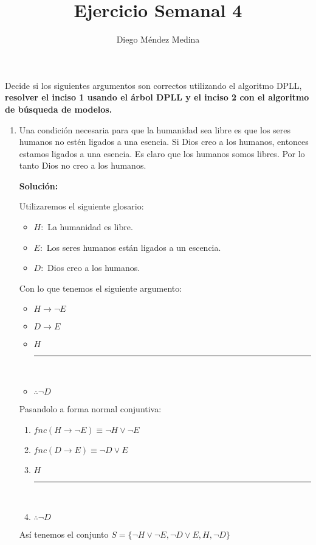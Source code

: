 \documentclass[8pt, letterpaper]{article}
\title{%
  Ejercicio Semanal 4\\
  {\large{}}}
\author{Diego Méndez Medina}
\date{}
\begin{document}
\ttfamily
\maketitle
\rmfamily
Decide si los siguientes argumentos son correctos utilizando el algoritmo DPLL,
{\bf resolver el inciso 1 usando el árbol DPLL y el inciso 2 con el algoritmo
  de búsqueda de modelos.}
\begin{enumerate}
\item Una condición necesaria para que la humanidad sea libre es que los seres
  humanos no estén ligados a una esencia. Si Dios creo a los humanos, entonces
  estamos ligados a una esencia. Es claro que los humanos somos libres. Por
  lo tanto Dios no creo a los humanos.

  \ttfamily
  {\bf Solución:}

  Utilizaremos el siguiente glosario:
  \begin{itemize}
  \item $H:$ La humanidad es libre.
  \item $E:$ Los seres humanos están ligados a un escencia.
  \item $D:$ Dios creo a los humanos.
  \end{itemize}


  \begin{multicols}{2}
    Con lo que tenemos el siguiente argumento:
  \begin{itemize}
  \item $H \rightarrow \neg E$
  \item $D \rightarrow E$
  \item $H$ \\
    \rule{.3\textwidth}{0.2mm}\\
  \item $\therefore \neg D$
  \end{itemize}
  Pasandolo a forma normal conjuntiva:
  \begin{enumerate}
  \item $fnc(H \rightarrow \neg E ) \equiv \neg H \lor \neg E$
  \item $fnc(D \rightarrow E) \equiv \neg D \lor E$
  \item $H$ \\
    \rule{.3\textwidth}{0.2mm}\\
  \item $\therefore \neg D$
  \end{enumerate}
  \end{multicols}
  Así tenemos el conjunto $S = \{\neg H\lor \neg E, \neg D\lor E, H, \neg D\}$
  

\end{enumerate}
\end{document}
